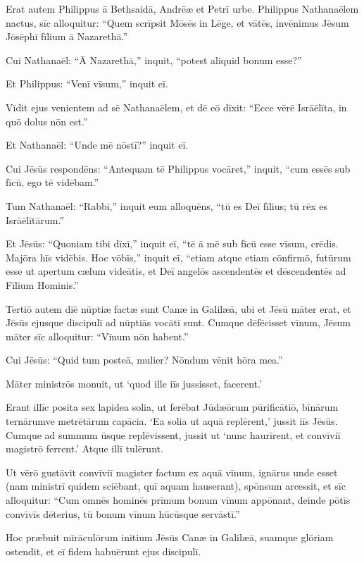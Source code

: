 \Versus Erat autem Philippus ā Bethsaidā, Andrēæ et Petrī urbe.
\Versus Philippus Nathanaēlem nactus, sīc alloquitur: ``Quem scrīpsit Mōsēs in Lēge, et vātēs, invēnimus Jēsum Jōsēphī fīlium ā Nazarethā.''

\Versus Cui Nathanaēl: ``Ā Nazarethā,'' inquit, ``potest aliquid bonum esse?''

Et Philippus: ``Venī vīsum,'' inquit eī.

\Versus Vīdit ejus venientem ad sē Nathanaēlem, et dē eō dīxit: ``Ecce vērē Isrāēlīta, in quō dolus nōn est.''

\Versus Et Nathanaēl: ``Unde mē nōstī?'' inquit eī.

Cui Jēsūs respondēns: ``Antequam tē Philippus vocāret,'' inquit, ``cum essēs sub fīcū, ego tē vidēbam.''

\Versus Tum Nathanaēl: ``Rabbi,'' inquit eum alloquēns, ``tū es Deī fīlius; tū rēx es Isrāēlī\-tārum.''

\Versus Et Jēsūs: ``Quoniam tibi dīxī,'' inquit eī, ``tē ā mē sub fīcū esse vīsum, crēdis. Majōra hīs vidēbis.
\Versus Hoc vōbīs,'' inquit eī, ``etiam atque etiam cōnfirmō, futūrum esse ut apertum cælum videātis, et Deī angelōs ascendentēs et dēscendentēs ad Fīlium Hominis.''


\Caput
\Versus Tertiō autem diē nūptiæ factæ sunt Canæ in Galilæā, ubi et Jēsū māter erat,
\Versus et Jēsūs ejusque discipulī ad nūptiās vocātī sunt.
\Versus Cumque dēfēcisset vīnum, Jēsum māter sīc alloquitur: ``Vīnum nōn habent.''

\Versus Cui Jēsūs: ``Quid tum posteā, mulier? Nōndum vēnit hōra mea.''

\Versus Māter ministrōs monuit, ut `quod ille iīs jussisset, facerent.'

\Versus Erant illīc posita sex lapidea solia, ut ferēbat Jūdæōrum pūrificātiō, bīnārum ter\-nārumve metrētārum capācia.
\Versus `Ea solia ut aquā replērent,' jussit iīs Jēsūs. Cumque ad summum ūsque replēvissent,
\Versus jussit ut `nunc haurīrent, et convīviī magistrō ferrent.' Atque illī tulērunt.

\Versus Ut vērō gustāvit convīviī magister factum ex aquā vīnum, ignārus unde esset (nam ministrī quidem sciēbant, quī aquam hauserant), spōnsum arcessit,
\Versus et sīc alloquitur: ``Cum omnēs hominēs prīmum bonum vīnum appōnant, deinde pōtīs convīvīs dēterius, tū bonum vīnum hūcūsque servāstī.''

\Versus Hoc præbuit mīrāculōrum initium Jēsūs Canæ in Galilæā, suamque glōriam ostendit, et eī fidem habuērunt ejus discipulī.


